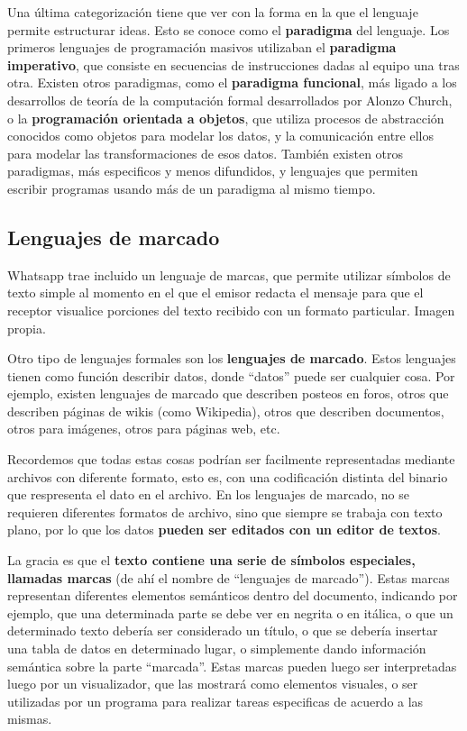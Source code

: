 Una última categorización tiene que ver con la forma en la que el lenguaje
permite estructurar ideas. Esto se conoce como el \textbf{paradigma} del lenguaje.
Los primeros lenguajes de programación masivos utilizaban el \textbf{paradigma
imperativo}, que consiste en secuencias de instrucciones dadas al equipo una tras
otra. Existen otros paradigmas, como el \textbf{paradigma funcional}, más ligado
a los desarrollos de teoría de la computación formal desarrollados por Alonzo
Church, o la \textbf{programación orientada a objetos}, que utiliza procesos
de abstracción conocidos como objetos para modelar los datos, y la comunicación
entre ellos para modelar las transformaciones de esos datos. También existen
otros paradigmas, más especificos y menos difundidos, y lenguajes que permiten
escribir programas usando más de un paradigma al mismo tiempo.


\subsection{Lenguajes de marcado}

{Whatsapp trae incluido un lenguaje de marcas, que permite utilizar símbolos
de texto simple al momento en el que el emisor redacta el mensaje para que el
receptor visualice porciones del texto recibido con un formato particular.}
{Imagen propia.}

Otro tipo de lenguajes formales son los \textbf{lenguajes de marcado}. Estos
lenguajes tienen como función describir datos, donde ``datos'' puede ser cualquier
cosa. Por ejemplo, existen lenguajes de marcado que describen posteos en foros,
otros que describen páginas de wikis (como Wikipedia), otros que describen
documentos, otros para imágenes, otros para páginas web, etc.

Recordemos que todas estas cosas podrían ser facilmente representadas mediante
archivos con diferente formato, esto es, con una codificación distinta del
binario que respresenta el dato en el archivo. En los lenguajes de marcado,
no se requieren diferentes formatos de archivo, sino que siempre se trabaja
con texto plano, por lo que los datos \textbf{pueden ser editados con un editor
de textos}.

La gracia es que el \textbf{texto contiene una serie de símbolos especiales, llamadas
marcas} (de ahí el nombre de ``lenguajes de marcado''). Estas marcas representan
diferentes elementos semánticos dentro del documento, indicando por ejemplo, que
una determinada parte se debe ver en negrita o en itálica, o que un determinado
texto debería ser considerado un título, o que se debería insertar una tabla de
datos en determinado lugar, o simplemente dando información semántica sobre
la parte ``marcada''. Estas marcas pueden luego ser interpretadas luego por un
visualizador, que las mostrará como elementos visuales, o ser utilizadas por
un programa para realizar tareas especificas de acuerdo a las mismas.

